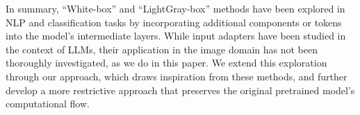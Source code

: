 In summary, ``White-box'' and ``LightGray-box'' methods have been explored in NLP and classification tasks by incorporating additional components or tokens into the model's intermediate layers. While input adapters have been studied in the context of LLMs, their application in the image domain has not been thoroughly investigated, as we do in this paper. We extend this exploration through our \oursp approach, which draws inspiration from these methods, and further develop a more restrictive \ours approach that preserves the original pretrained model's computational flow. 
